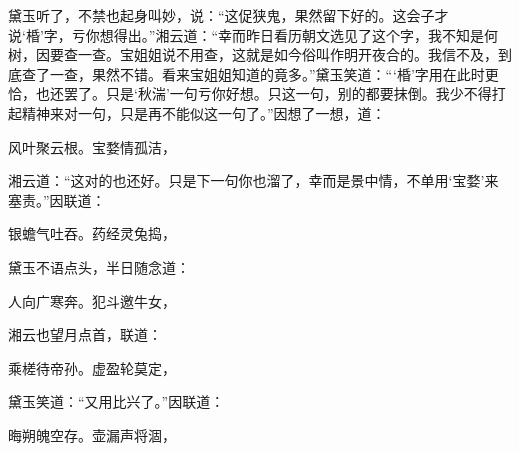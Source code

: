 \begin{parag}
    黛玉听了，不禁也起身叫妙，说：“这促狭鬼，果然留下好的。这会子才说‘棔’字，亏你想得出。”湘云道：“幸而昨日看历朝文选见了这个字，我不知是何树，因要查一查。宝姐姐说不用查，这就是如今俗叫作明开夜合的。我信不及，到底查了一查，果然不错。看来宝姐姐知道的竟多。”黛玉笑道：“‘棔’字用在此时更恰，也还罢了。只是‘秋湍’一句亏你好想。只这一句，别的都要抹倒。我少不得打起精神来对一句，只是再不能似这一句了。”因想了一想，道：
\end{parag}


\begin{poem}
    \begin{pl}
        风叶聚云根。宝婺情孤洁，
    \end{pl}
\end{poem}

\begin{parag}
    湘云道：“这对的也还好。只是下一句你也溜了，幸而是景中情，不单用‘宝婺’来塞责。”因联道：
\end{parag}
\begin{poem}
    \begin{pl}
        银蟾气吐吞。药经灵兔捣，
    \end{pl}
\end{poem}
\begin{parag}
    黛玉不语点头，半日随念道：
\end{parag}
\begin{poem}
    \begin{pl}
        人向广寒奔。犯斗邀牛女，
    \end{pl}
\end{poem}

\begin{parag}
    湘云也望月点首，联道：
\end{parag}
\begin{poem}
    \begin{pl}
        乘槎待帝孙。虚盈轮莫定，
    \end{pl}
\end{poem}

\begin{parag}
    黛玉笑道：“又用比兴了。”因联道：
\end{parag}
\begin{poem}
    \begin{pl}
        晦朔魄空存。壶漏声将涸，
    \end{pl}
\end{poem}

